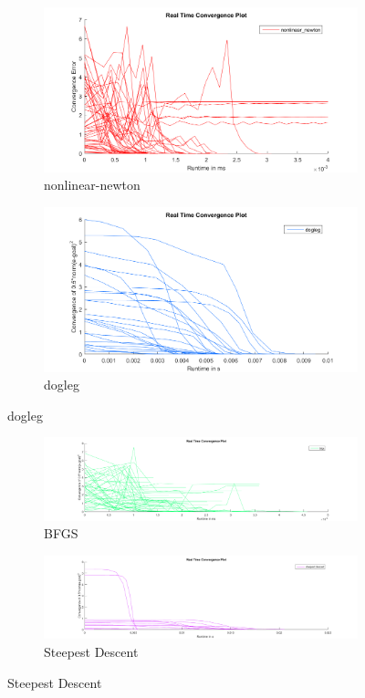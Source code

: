 \documentclass[11pt]{article} %
\begin{document}
\begin{figure}[h!]
\centering
\begin{subfigure}{.5\textwidth}
  \centering
  \includegraphics[width=.8\linewidth]{linear}
  \caption{nonlinear-newton}
  \label{fig:nonlinear}
\end{subfigure}%
\begin{subfigure}{.5\textwidth}
  \centering
  \includegraphics[width=.8\linewidth]{dogleg}
  \caption{dogleg}
  \label{fig:dogleg}
\end{subfigure}
\label{fig:test}
\end{figure}

\begin{figure}[h!]
\centering
\begin{subfigure}{.5\textwidth}
\setcounter{subfigure}{2}
  \centering
  \includegraphics[width=.8\linewidth]{bfgs}
  \caption{BFGS}
  \label{fig:bfgs}
\end{subfigure}%
\begin{subfigure}{.5\textwidth}
\setcounter{subfigure}{3}
  \centering
  \includegraphics[width=.8\linewidth]{steepest_descent}
  \caption{Steepest Descent}
  \label{fig:dd}
\end{subfigure}
\label{fig:test}
\end{figure}
\end{document}
